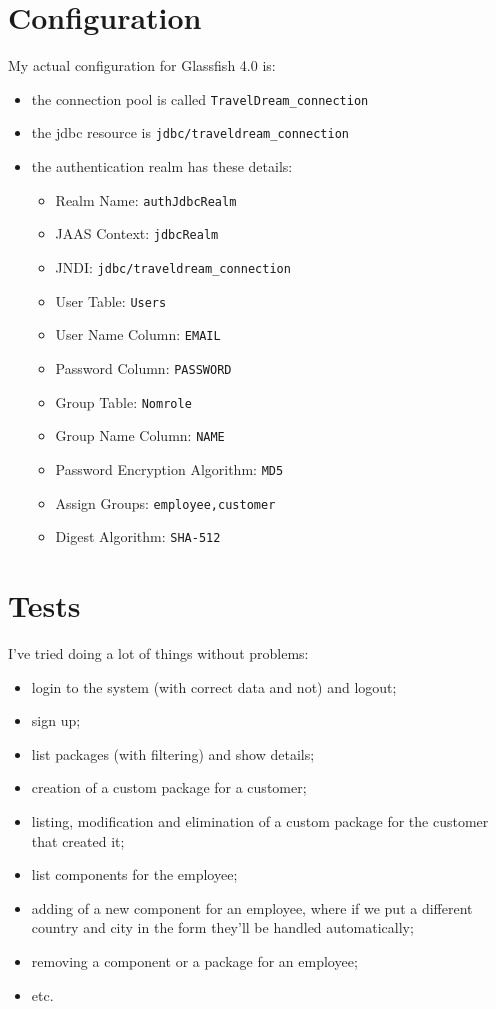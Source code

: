 \documentclass[a4paper,12pt]{article}
\begin{document}
\section{Configuration}
My actual configuration for Glassfish 4.0 is:
\begin{itemize}
    \item the connection pool is called    \texttt{TravelDream\_connection}
    \item the jdbc resource is \texttt{jdbc/traveldream\_connection}
    \item the authentication realm has these details:
    \begin{itemize}
      \item Realm Name: \texttt{authJdbcRealm}
      \item JAAS Context: \texttt{jdbcRealm}
      \item JNDI: \texttt{jdbc/traveldream\_connection}
      \item User Table: \texttt{Users}
      \item User Name Column: \texttt{EMAIL}
      \item Password Column: \texttt{PASSWORD}
      \item Group Table: \texttt{Nomrole}
      \item Group Name Column: \texttt{NAME}
      \item Password Encryption Algorithm: \texttt{MD5}
      \item Assign Groups: \texttt{employee,customer}
      \item Digest Algorithm: \texttt{SHA-512}
    \end{itemize}
  \end{itemize}

\section{Tests}
I've tried doing a lot of things without problems:
\begin{itemize}
  \item login to the system (with correct data and not) and logout;
  \item sign up;
  \item list packages (with filtering) and show details;
  \item creation of a custom package for a customer;
  \item listing, modification and elimination of a custom package for the customer that created it;
  \item list components for the employee;
  \item adding of a new component for an employee, where if we put a different country and city in the form they'll be handled automatically;
  \item removing a component or a package for an employee;
  \item etc.
\end{itemize}
\end{document}
